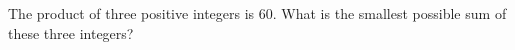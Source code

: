 The product of three positive integers is $60$. What is the smallest possible sum of these three integers?
